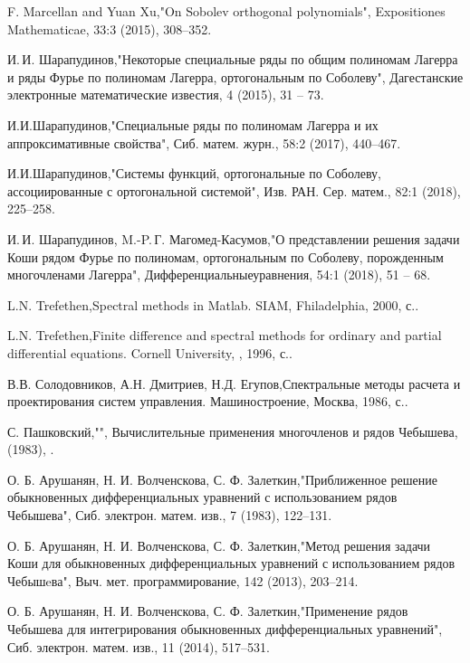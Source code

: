\begin{thebibliography}{20}
F. Marcellan and Yuan Xu,"On Sobolev orthogonal polynomials", Expositiones Mathematicae, 33:3 (2015), 308--352.

И.\,И. Шарапудинов,"Некоторые специальные ряды по общим полиномам Лагерра и ряды Фурье по полиномам Лагерра, ортогональным по Соболеву", Дагестанские электронные математические известия, 4 (2015), 31 -- 73.

И.И.Шарапудинов,"Специальные ряды по полиномам Лагерра и их аппроксимативные свойства", Сиб. матем. журн., 58:2 (2017), 440–467.

И.И.Шарапудинов,"Системы функций, ортогональные по Соболеву, ассоциированные с ортогональной системой", Изв. РАН. Сер. матем., 82:1 (2018), 225--258.

И.\,И. Шарапудинов, M.-P.\,Г. Магомед-Касумов,"О представлении решения задачи Коши  рядом Фурье  по полиномам, ортогональным по  Соболеву, порожденным многочленами Лагерра", Дифференциальныеуравнения, 54:1 (2018), 51 -- 68.

L.N. Trefethen,Spectral methods in Matlab. SIAM, Fhiladelphia, 2000,  с..

L.N. Trefethen,Finite difference and spectral methods for ordinary and partial differential equations. Cornell University, , 1996,  с..

В.В. Солодовников, А.Н. Дмитриев, Н.Д. Егупов,Спектральные методы расчета и проектирования систем управления. Машиностроение, Москва, 1986,  с..

С. Пашковский,"", Вычислительные применения многочленов и рядов Чебышева,  (1983), .

О. Б. Арушанян, Н. И. Волченскова, С. Ф. Залеткин,"Приближенное решение обыкновенных дифференциальных уравнений с использованием рядов Чебышева", Сиб. электрон. матем. изв., 7 (1983), 122–131.

О. Б. Арушанян, Н. И. Волченскова, С. Ф. Залеткин,"Метод решения задачи Коши для обыкновенных дифференциальных уравнений с использованием рядов Чебышeва", Выч. мет. программирование, 142 (2013), 203--214.

О. Б. Арушанян, Н. И. Волченскова, С. Ф. Залеткин,"Применение рядов Чебышева для интегрирования обыкновенных дифференциальных уравнений", Сиб. электрон. матем. изв., 11 (2014), 517--531.


\end{thebibliography}
